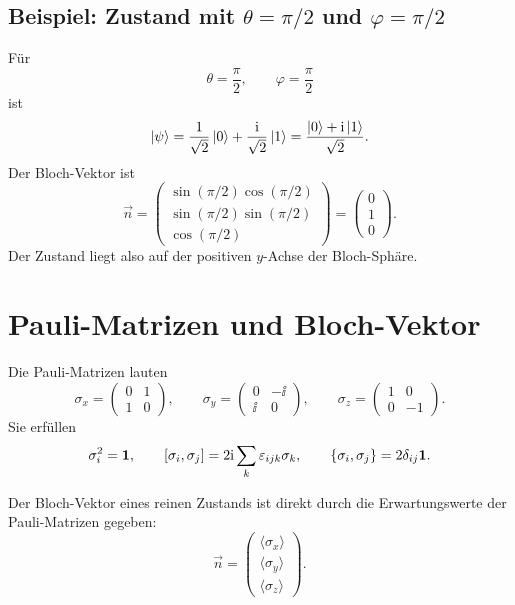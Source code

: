 \subsection{Beispiel: Zustand mit \(\theta=\pi/2\) und \(\varphi=\pi/2\)}

Für
\[
    \theta=\frac{\pi}{2},
    \qquad
    \varphi=\frac{\pi}{2}
\]
ist
\[
    \left|\psi\right\rangle
    =\frac{1}{\sqrt2}\left|0\right\rangle
    +\frac{\mathrm{i}}{\sqrt2}\left|1\right\rangle
    =\frac{\left|0\right\rangle+\mathrm{i}\left|1\right\rangle}{\sqrt2}.
\]
Der Bloch-Vektor ist
\[
    \vec n
    =\begin{pmatrix}
        \sin(\pi/2)\cos(\pi/2)\\
        \sin(\pi/2)\sin(\pi/2)\\
        \cos(\pi/2)
    \end{pmatrix}
    =\begin{pmatrix}0\\1\\0\end{pmatrix}.
\]
Der Zustand liegt also auf der positiven \(y\)-Achse der Bloch-Sphäre.

\section{Pauli-Matrizen und Bloch-Vektor}

Die Pauli-Matrizen lauten
\[
    \sigma_x=\begin{pmatrix}0&1\\1&0\end{pmatrix},
    \qquad
    \sigma_y=\begin{pmatrix}0&-\ii\\\ii&0\end{pmatrix},
    \qquad
    \sigma_z=\begin{pmatrix}1&0\\0&-1\end{pmatrix}.
\]
Sie erfüllen
\[
    \sigma_i^2=\mathbf{1},
    \qquad
    [\sigma_i,\sigma_j]=2\mathrm{i}\sum_k\varepsilon_{ijk}\sigma_k,
    \qquad
    \{\sigma_i,\sigma_j\}=2\delta_{ij}\mathbf{1}.
\]

Der Bloch-Vektor eines reinen Zustands ist direkt durch die Erwartungswerte der Pauli-Matrizen gegeben:
\[
    \vec n
    =\begin{pmatrix}
        \langle \sigma_x\rangle\\
        \langle \sigma_y\rangle\\
        \langle \sigma_z\rangle
    \end{pmatrix}.
\]

